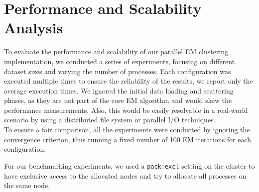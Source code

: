 \section{Performance and Scalability Analysis}
To evaluate the performance and scalability of our parallel EM clustering implementation, we conducted a series of experiments, focusing on different dataset sizes and varying the number of processes. 
Each configuration was executed multiple times to ensure the reliability of the results, we report only the average execution times.
We ignored the initial data loading and scattering phases, as they are not part of the core EM algorithm and would skew the performance measurements.
Also, this would be easily resolvable in a real-world scenario by using a distributed file system or parallel I/O techniques.
\\To ensure a fair comparison, all the experiments were conducted by ignoring the convergence criterion, thus running a fixed number of 100 EM iterations for each configuration.

For our benchmarking experiments, we used a \texttt{pack:excl} setting on the cluster to have exclusive access to the allocated nodes and try to allocate all processes on the same node.

